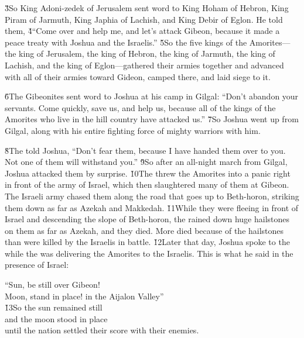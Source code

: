 \v{3}So King Adoni-zedek of Jerusalem sent word to King Hoham of Hebron, King Piram of Jarmuth, King Japhia of Lachish, and King Debir of Eglon. He told them, \v{4}``Come over and help me, and let's attack Gibeon, because it made a peace treaty with Joshua and the Israelis.'' \v{5}So the five kings of the Amorites---the king of Jerusalem, the king of Hebron, the king of Jarmuth, the king of Lachish, and the king of Eglon---gathered their armies together and advanced with all of their armies toward Gideon, camped there, and laid siege to it.

\v{6}The Gibeonites sent word to Joshua at his camp in Gilgal: ``Don't abandon your servants. Come quickly, save us, and help us, because all of the kings of the Amorites who live in the hill country have attacked us.'' \v{7}So Joshua went up from Gilgal, along with his entire fighting force of mighty warriors with him.

\v{8}The  told Joshua, ``Don't fear them, because I have handed them over to you. Not one of them will withstand you.'' \v{9}So after an all-night march from Gilgal, Joshua attacked them by surprise. \v{10}The  threw the Amorites into a panic right in front of the army of Israel, which then slaughtered many of them at Gibeon. The Israeli army chased them along the road that goes up to Beth-horon, striking them down as far as Azekah and Makkedah. \v{11}While they were fleeing in front of Israel and descending the slope of Beth-horon, the  rained down huge hailstones on them as far as Azekah, and they died. More died because of the hailstones than were killed by the Israelis in battle. \v{12}Later that day, Joshua spoke to the  while the  was delivering the Amorites to the Israelis. This is what he said in the presence of Israel:

\begin{poetry}
\poeml ``Sun, be still over Gibeon! \\
\poemll    Moon, stand in place! in the Aijalon Valley'' \\
\poeml \v{13}So the sun remained still \\
\poemll    and the moon stood in place \\
\poemlll       until the nation settled their score with their enemies.
\end{poetry}

